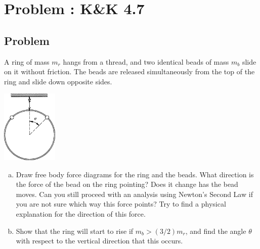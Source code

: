 \documentclass[solutions]{esg8012pset}
\begin{document}
\section{Problem \thesection: K\&K 4.7}
\subsection{Problem}
  A ring of mass $m_r$ hangs from a thread, and two identical beads of mass $m_b$ slide on it without friction. The beads are released simultaneously from the top of the ring and slide down opposite sides.
  \begin{center}\includegraphics[width=0.2\textwidth]{ps06_2}\end{center}
  \begin{enumerate}[(a)]
    \item Draw free body force diagrams for the ring and the beads. What direction is the force of the bead on the ring pointing? Does it change has the bead moves. Can you still proceed with an analysis using Newton's Second Law if you are not sure which way this force points? Try to find a physical explanation for the direction of this force.
    \item Show that the ring will start to rise if $m_b > (3/2)m_r$, and find the angle $\theta$ with respect to the vertical direction that this occurs.
  \end{enumerate}
\end{document}
